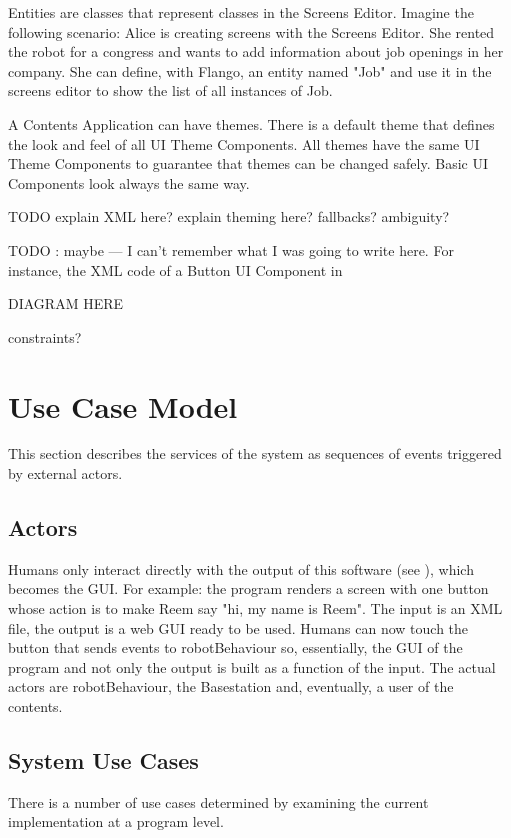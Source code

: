 Entities are classes that represent classes in the Screens Editor. 
Imagine the following scenario: Alice is creating screens with the Screens Editor.
She rented the robot for a congress and wants to add information about job openings in her company.
She can define, with Flango, an entity named "Job" and use it in the screens editor to show the list of all instances of Job.

A Contents Application can have themes.
There is a default theme that defines the look and feel of all UI Theme Components.
All themes have the same UI Theme Components to guarantee that themes can be changed safely.
Basic UI Components look always the same way.

TODO explain XML here? explain theming here? fallbacks? ambiguity?

TODO : maybe --- I can't remember what I was going to write here.
For instance, the \ac{XML} code of a Button UI Component in 



DIAGRAM HERE


constraints?

\section{Use Case Model}
This section describes the services of the system as sequences of events triggered by external actors.

\subsection{Actors}
Humans only interact directly with the output of this software (see ), which becomes the \ac{GUI}.
For example: the program renders a screen with one button whose action is to make Reem say "hi, my name is Reem".
The input is an \ac{XML} file, the output is a web \ac{GUI} ready to be used.
Humans can now touch the button that sends events to robotBehaviour so, essentially, the \ac{GUI} of the program and not only the output is built as a function of the input.
The actual actors are robotBehaviour, the Basestation and, eventually, a user of the contents.


\subsection{System Use Cases}
There is a number of use cases determined by examining the current implementation at a program level.


